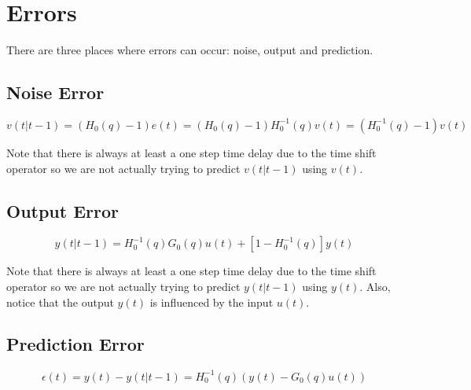 \mainmatter%
\setcounter{page}{1}

\lectureseries[\course]{\course}

\date{November 3, 2009}

\setaddress%

\setcounter{lecture}{11}
\setcounter{chapter}{11}


\section{Errors}
There are three places where errors can occur: noise, output and prediction.

\subsection{Noise Error}

\begin{equation*}
v(t|t-1) = (H_0(q)-1)e(t) = (H_0(q)-1)H_0^{-1}(q)v(t) = (H_0^{-1}(q)-1)v(t)
\end{equation*}

Note that there is always at least a one step time delay due to the time shift operator so we are not actually trying to predict $v(t|t-1)$ using $v(t)$.

\subsection{Output Error}

\begin{equation*}
y(t|t-1) = H_0^{-1}(q)G_0(q)u(t) + [1-H_0^{-1}(q)]y(t)
\end{equation*}

Note that there is always at least a one step time delay due to the time shift operator so we are not actually trying to predict $y(t|t-1)$ using $y(t)$.
Also, notice that the output $y(t)$ is influenced by the input $u(t)$.

\subsection{Prediction Error}

\begin{equation*}
\epsilon(t) = y(t) - y(t|t-1) = H_0^{-1}(q)(y(t)-G_0(q)u(t))
\end{equation*}

